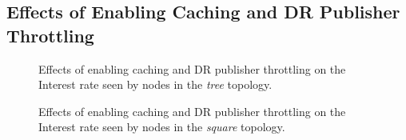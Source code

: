 \begin{appendices}
\section{Effects of Enabling Caching and DR Publisher Throttling}

\begin{figure}[H]
    \centering
    \caption{Effects of enabling caching and DR publisher throttling on the Interest rate seen by nodes in the \textit{tree} topology.}
    \label{fig:app:caching:dr-pub-throt-tree}
\end{figure}

\begin{figure}[H]
    \centering
    \caption{Effects of enabling caching and DR publisher throttling on the Interest rate seen by nodes in the \textit{square} topology.}
    \label{fig:app:caching:dr-pub-throt-square}
\end{figure}

\end{appendices}